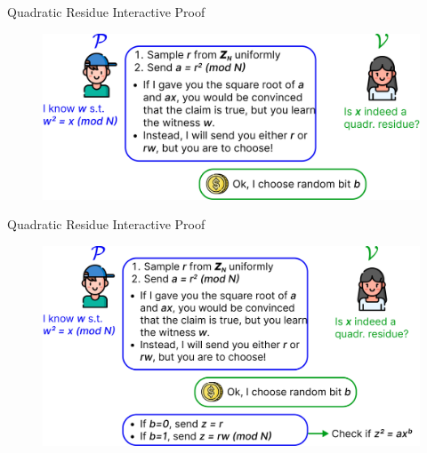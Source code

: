 \documentclass{zkdl-presentation-template}
\begin{document}
    \begin{frame}{Quadratic Residue Interactive Proof}
        \begin{figure}
            \centering
            \includegraphics[width=\textwidth]{images/lecture_6/qr_test_3.pdf}
        \end{figure}
    \end{frame}

    \begin{frame}{Quadratic Residue Interactive Proof}
        \begin{figure}
            \centering
            \includegraphics[width=\textwidth]{images/lecture_6/qr_test_4.pdf}
        \end{figure}
    \end{frame}
\end{document}

